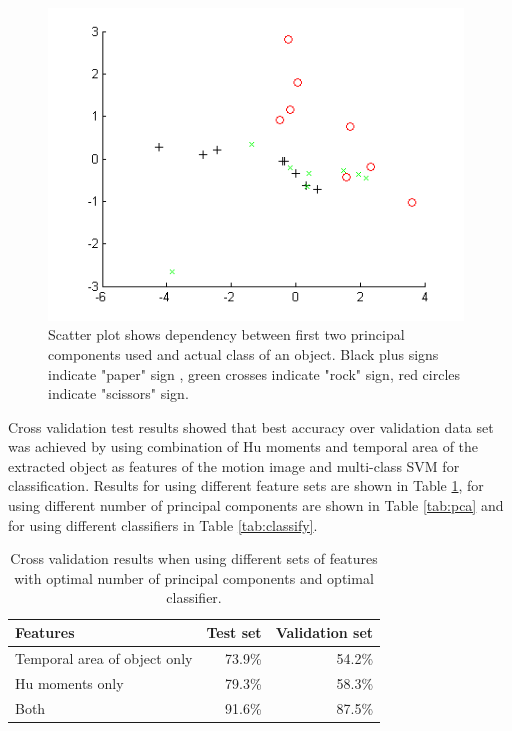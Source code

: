 
\begin{figure}
\begin{center}
\includegraphics[width=110mm]{paclassplot.png}
\caption{Scatter plot shows dependency between first two principal components used and actual class of an object. Black plus signs indicate "paper" sign , green crosses indicate "rock" sign, red circles indicate "scissors" sign. }
\label{fig:paclassplot}
\end{center}
\end{figure}

Cross validation test results showed that best accuracy over validation data set was achieved by using combination of Hu moments and temporal area of the extracted object as features of the motion image and multi-class SVM for classification. Results for using different feature sets are shown in Table \ref{tab:features}, for using different number of principal components are shown in Table \ref{tab:pca} and for using different classifiers in Table \ref{tab:classify}.

\begin{table}
\begin{center}
\begin{tabular}{| l | r | r |}
\hline
Features & Test set & Validation set \\ \hline
Temporal area of object only & 73.9\% & 54.2\% \\
Hu moments only & 79.3\% & 58.3\% \\
Both & 91.6\% & 87.5\% \\
\hline
\end{tabular}
\end{center}
\caption{Cross validation results when using different sets of features with optimal number of principal components and optimal classifier.}
\label{tab:features}
\end{table}



